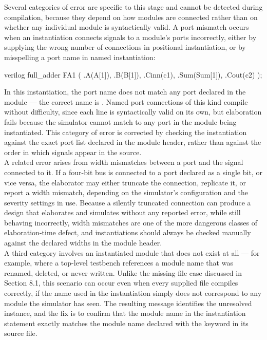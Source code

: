 Several categories of error are specific to this stage and cannot be detected during compilation, because they depend on how modules are connected rather than on whether any individual module is syntactically valid. A port mismatch occurs when an instantiation connects signals to a module's ports incorrectly, either by supplying the wrong number of connections in positional instantiation, or by misspelling a port name in named instantiation:

\begin{codeblock}{verilog}
full_adder FA1 (
    .A(A[1]),
    .B(B[1]),
    .Cinn(c1),
    .Sum(Sum[1]),
    .Cout(c2)
);
\end{codeblock}

In this instantiation, the port name  does not match any port declared in the  module --- the correct name is . Named port connections of this kind compile without difficulty, since each line is syntactically valid on its own, but elaboration fails because the simulator cannot match  to any port in the module being instantiated. This category of error is corrected by checking the instantiation against the exact port list declared in the module header, rather than against the order in which signals appear in the source.\\

A related error arises from width mismatches between a port and the signal connected to it. If a four-bit bus is connected to a port declared as a single bit, or vice versa, the elaborator may either truncate the connection, replicate it, or report a width mismatch, depending on the simulator's configuration and the severity settings in use. Because a silently truncated connection can produce a design that elaborates and simulates without any reported error, while still behaving incorrectly, width mismatches are one of the more dangerous classes of elaboration-time defect, and instantiations should always be checked manually against the declared widths in the module header.\\

A third category involves an instantiated module that does not exist at all --- for example, where a top-level testbench references a module name that was renamed, deleted, or never written. Unlike the missing-file case discussed in Section 8.1, this scenario can occur even when every supplied file compiles correctly, if the name used in the instantiation simply does not correspond to any module the simulator has seen. The resulting message identifies the unresolved instance, and the fix is to confirm that the module name in the instantiation statement exactly matches the module name declared with the  keyword in its source file.

